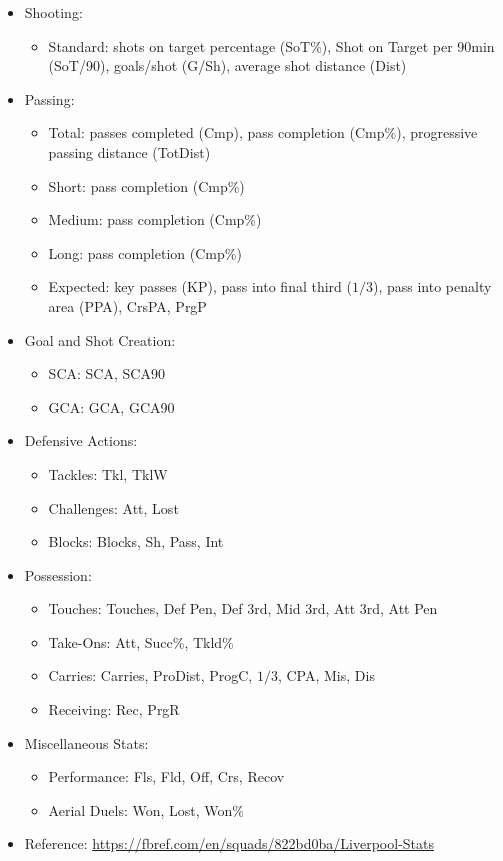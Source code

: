 \documentclass[12pt]{report}
\begin{document}
{\begin{itemize}
\begin{itemize}
        \item Shooting:
        \begin{itemize}
           \item Standard: shots on target percentage (SoT\%), Shot on Target per 90min (SoT/90), goals/shot (G/Sh), average shot distance (Dist)
        \end{itemize}
        \item Passing:
        \begin{itemize}
            \item Total: passes completed (Cmp), pass completion (Cmp\%), progressive passing distance (TotDist)
            \item Short: pass completion (Cmp\%)
     \item Medium: pass completion (Cmp\%)
            \item Long: pass completion (Cmp\%)
            \item Expected: key passes (KP), pass into final third ($1/3$), pass into penalty area (PPA), CrsPA, PrgP
        \end{itemize}
        \item Goal and Shot Creation:
        \begin{itemize}
            \item SCA: SCA, SCA90
        \item GCA: GCA, GCA90
        \end{itemize}
        \item Defensive Actions:
        \begin{itemize}
            \item Tackles: Tkl, TklW
            \item Challenges: Att, Lost
            \item Blocks: Blocks, Sh, Pass, Int
        \end{itemize}
\item Possession:
        \begin{itemize}
            \item Touches: Touches, Def Pen, Def 3rd, Mid 3rd, Att 3rd, Att Pen
            \item Take-Ons: Att, Succ\%, Tkld\%
            \item Carries: Carries, ProDist, ProgC, $1/3$, CPA, Mis, Dis
            \item Receiving: Rec, PrgR
        \end{itemize}
\item Miscellaneous Stats:
        \begin{itemize}
            \item Performance: Fls, Fld, Off, Crs, Recov
            \item Aerial Duels: Won, Lost, Won\%
        \end{itemize}
        \item Reference: \url{https://fbref.com/en/squads/822bd0ba/Liverpool-Stats}
    \end{itemize}
\end{itemize}

}
\end{document}
